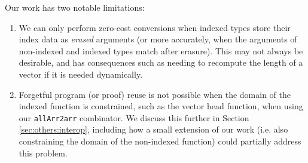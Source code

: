 \documentclass[acmsmall,screen]{acmart}
\newcommand{\refsec}[1]{Section \ref{sec:#1}}
\begin{document}
Our work has two notable limitations:
\begin{enumerate}
\item We can only perform zero-cost conversions when indexed types
  store their index data as \textit{erased} arguments
  (or more accurately, when the arguments of
  non-indexed and indexed types match after erasure). This may not
  always be desirable, and has consequences such as needing to
  recompute the length of a vector if it is needed dynamically.
\item Forgetful program (or proof) reuse is not possible when the domain of the
  indexed function is constrained, such as the vector head function, when using
  our \verb;allArr2arr; combinator. We discuss this further in
  \refsec{others:interop}, including how a small extension of our work
  (i.e. also constraining the domain of the non-indexed function)
  could partially address this problem.
\end{enumerate}
\end{document}
